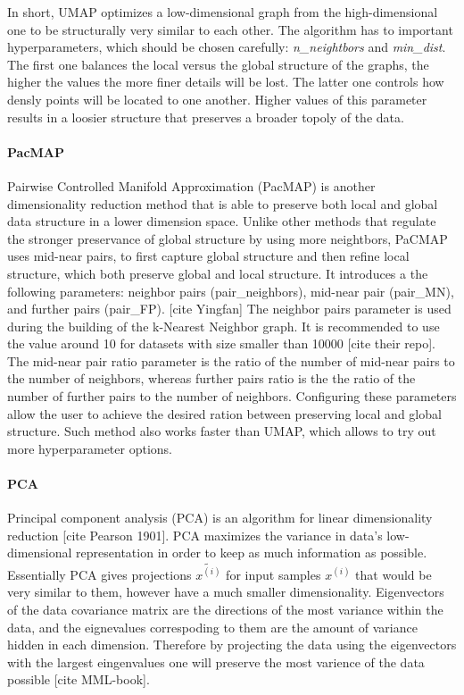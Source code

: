 In short, UMAP optimizes a low-dimensional graph from the high-dimensional one to be structurally very similar to each other. The algorithm has to important hyperparameters, which should be chosen carefully: \textit{n\_neightbors} and \textit{min\_dist}. The first one balances the local versus the global structure of the graphs, the higher the values the more finer details will be lost. The latter one controls how densly points will be located to one another. Higher values of this parameter results in a loosier structure that preserves a broader topoly of the data. 

\paragraph{PacMAP}
Pairwise Controlled Manifold Approximation (PacMAP) is another dimensionality reduction method that is able to preserve both local and global data structure in a lower dimension space. Unlike other methods that regulate the stronger preservance of global structure by using more neightbors, PaCMAP uses mid-near pairs, to first capture global structure and then refine local structure, which both preserve global and local structure. It introduces a the following parameters: neighbor pairs (pair\_neighbors), mid-near pair (pair\_MN), and further pairs (pair\_FP). [cite Yingfan] The neighbor pairs parameter is used during the building of the k-Nearest Neighbor graph. It is recommended to use the value around 10 for datasets with size smaller than 10000 [cite their repo]. The mid-near pair ratio parameter is the ratio of the number of mid-near pairs to the number of neighbors, whereas further pairs ratio is the the ratio of the number of further pairs to the number of neighbors. Configuring these parameters allow the user to achieve the desired ration between preserving local and global structure. Such method also works faster than UMAP, which allows to try out more hyperparameter options.

\paragraph{PCA}
Principal component analysis (PCA) is an algorithm for linear dimensionality reduction [cite Pearson 1901].  PCA maximizes the variance in data's low-dimensional representation in order to keep as much information
as possible. Essentially PCA gives projections $\tilde{x^{(i)}}$ for input samples $x^{(i)}$ that would be very similar to them, however have a much smaller dimensionality. Eigenvectors of the data covariance matrix are the directions of the most variance within the data, and the eignevalues correspoding to them are the amount of variance hidden in each dimension. Therefore by projecting the data using the eigenvectors with the largest eingenvalues one will preserve the most varience of the data possible [cite MML-book].

